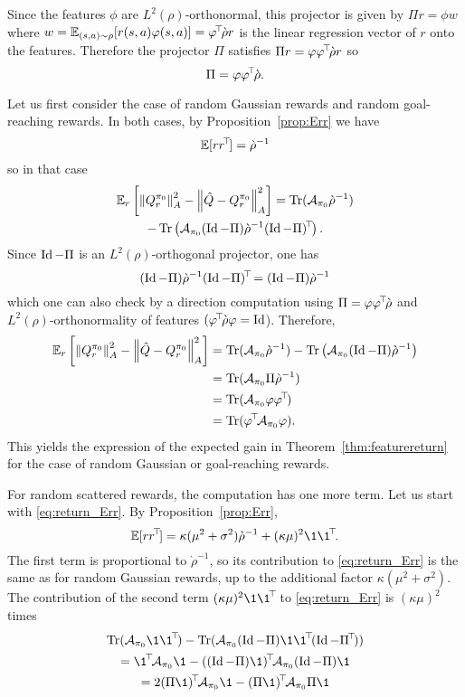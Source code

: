 \documentclass[11pt,a4paper]{article}
\newcommand{\AK}{\mathcal{A}}
\newcommand{\drho}{\grave \rho}
\begin{document}
\begin{dem}
Since the
features $\phi$ are $L^2(\rho)$-orthonormal, this projector is given by
$\Pi r=\phi w$ where $w=\E_{(s,a)\sim \rho}
[r(s,a)\phi(s,a)]=\transp{\phi}\drho r$ is the linear regression vector
of $r$ onto the features. Therefore the projector $\Pi$ satisfies $\Pi
r=\phi\transp{\phi}\drho r$ so
\begin{equation}
\Pi=\phi\transp{\phi}\drho.
\end{equation}

Let us first consider the case of random Gaussian rewards and random
goal-reaching rewards. In both cases, by Proposition~\ref{prop:Err} we
have
\begin{equation}
\E[r\transp{r}]=\drho^{-1}
\end{equation}
so in that case
\begin{multline}
\E_r\left[\norm{Q^{\pi_0}_r}^2_A-\norm{\hat Q-Q^{\pi_0}_r}^2_A\right]=
\Tr(\AK_{\pi_0} \drho^{-1})
\\-\Tr\left(\AK_{\pi_0} (\Id-\Pi)\drho^{-1}\transp{(\Id-\Pi)}\right).
\end{multline}
Since $\operatorname{Id}-\Pi$ is an $L^2(\rho)$-orthogonal projector, one has
\begin{equation}
(\Id-\Pi)\drho^{-1}\transp{(\Id-\Pi)}=(\Id-\Pi)\drho^{-1}
\end{equation}
which one can also check by a direction computation using
$\Pi=\phi\transp{\phi}\drho$ and $L^2(\rho)$-orthonormality of features
$(\transp{\phi}\drho \phi=\Id$). Therefore,
\begin{align}
\E_r\left[\norm{Q^{\pi_0}_r}^2_A-\norm{\hat Q-Q^{\pi_0}_r}^2_A\right]&=
\Tr(\AK_{\pi_0} \drho^{-1})
-\Tr\left(\AK_{\pi_0} (\Id-\Pi)\drho^{-1}\right)
\\&=\Tr(\AK_{\pi_0}\Pi\drho^{-1})
\\&=\Tr(\AK_{\pi_0}\phi\transp{\phi})
\\&=\Tr(\transp{\phi}\AK_{\pi_0}\phi).
\end{align}
This yields the expression of the expected gain in Theorem~\ref{thm:featurereturn} for the case of
random Gaussian or goal-reaching rewards.

For random scattered rewards, the computation has one more term. Let us
start with \eqref{eq:return_Err}. By Proposition~\ref{prop:Err}, 
\begin{equation}
\E [r\transp{r}]=
\kappa (\mu^2+\sigma^2)\drho^{-1}+
(\kappa\mu)^2 \1\transp{\1}.
\end{equation}
The first term is proportional to $\drho^{-1}$, so its contribution to
\eqref{eq:return_Err} is
the same as for random Gaussian rewards, up to the additional factor
$\kappa (\mu^2+\sigma^2)$. The contribution of the second term
$(\kappa\mu)^2 \1\transp{\1}$ to \eqref{eq:return_Err} is $(\kappa\mu)^2$
times
\begin{multline}
\Tr(\AK_{\pi_0}\1\transp{\1})-\Tr(\AK_{\pi_0}(\Id-\Pi)\1\transp{\1}\transp{(\Id-\Pi}))
\\=\transp{\1}\AK_{\pi_0}\1-\transp{((\Id-\Pi)\1)}\AK_{\pi_0}(\Id-\Pi)\1
\\=2\transp{(\Pi\1)}\AK_{\pi_0}\1-\transp{(\Pi\1)}\AK_{\pi_0}\Pi\1
\end{multline}


\end{dem}
\end{document}

